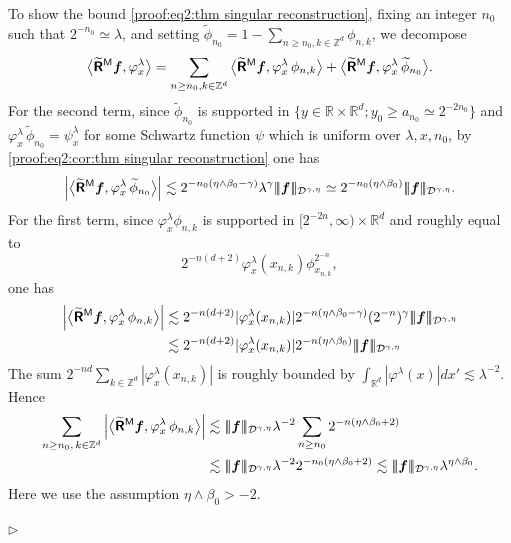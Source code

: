 \documentclass[10pt, reqno]{amsart}
\numberwithin{subsection}{section}
\numberwithin{subsubsection}{subsection}
\numberwithin{equation}{section} %
\newenvironment{Dem}[1][\unskip]{%
    \begin{list}{\hspace{1.15cm}{\sf \textbf{{\small Proof #1 --}}}}{%
        \setlength{\topsep}{0pt}%
        \setlength{\leftmargin}{0pt}%
        \setlength{\rightmargin}{0pt}%
        \setlength{\listparindent}{0pt}%
        \setlength{\itemindent}{0pt}%
        \setlength{\parsep}{0pt}%
        \addtolength{\leftmargin}{0pt}%
        \addtolength{\rightmargin}{0pt}%
    } \item }{\hfill $\rhd$\end{list}\smallskip}
\theoremstyle{mystyle}
\theoremstyle{mystyle2}
\theoremstyle{mystyle3}
\newcommand{\bsf}{\boldsymbol{f}}
\newcommand\bbR{\mathbb{R}}
\newcommand\bbZ{\mathbb{Z}}
\newcommand{\mcD}{\mathcal{D}}
\begin{document}
\begin{Dem}[of Theorem \ref{thm singular reconstruction}]
To show the bound \eqref{proof:eq2:thm singular reconstruction}, fixing an integer $n_0$ such that $2^{-n_0}\simeq \lambda$, and setting $\widetilde{\phi}_{n_0}=1-\sum_{n\ge n_0,k\in\bbZ^d}\phi_{n,k}$, we decompose
$$
\big\langle \widetilde{\textbf{\textsf{R}}}{}^{\sf M}\bsf,\varphi_x^\lambda \big\rangle
=\sum_{n\ge n_0,k\in\bbZ^d}\big\langle \widetilde{\textbf{\textsf{R}}}{}^{\sf M}\bsf,\varphi_x^\lambda\,\phi_{n,k} \big\rangle
+ \big\langle \widetilde{\textbf{\textsf{R}}}{}^{\sf M}\bsf,\varphi_x^\lambda\,\widetilde{\phi}_{n_0} \big\rangle.
$$
For the second term, since $\widetilde{\phi}_{n_0}$ is supported in $\{y\in\bbR\times\bbR^d;y_0\ge a_{n_0}\simeq2^{-2n_0}\}$ and $\varphi_x^\lambda\,\widetilde{\phi}_{n_0}=\psi_x^\lambda$ for some Schwartz function $\psi$ which is uniform over $\lambda,x,n_0$, by \eqref{proof:eq2:cor:thm singular reconstruction} one has
\begin{align*}
\left|\big\langle \widetilde{\textbf{\textsf{R}}}{}^{\sf M}\bsf,\varphi_x^\lambda\,\widetilde{\phi}_{n_0} \big\rangle\right|
\lesssim2^{-n_0(\eta\wedge\beta_0-\gamma)}\lambda^\gamma|\!|\!|\bsf|\!|\!|_{\mcD^{\gamma,\eta}}
\simeq2^{-n_0(\eta\wedge\beta_0)}|\!|\!|\bsf|\!|\!|_{\mcD^{\gamma,\eta}}.
\end{align*}
For the first term, since $\varphi_x^\lambda\phi_{n,k}$ is supported in $[2^{-2n},\infty)\times\bbR^d$ and roughly equal to 
$$
2^{-n(d+2)}\varphi_x^\lambda(x_{n,k})\phi_{x_{n,k}}^{2^{-n}},
$$ 
one has
\begin{align*}
\left|\big\langle \widetilde{\textbf{\textsf{R}}}{}^{\sf M}\bsf,\varphi_x^\lambda\,\phi_{n,k}\big\rangle\right|
&\lesssim2^{-n(d+2)}|\varphi_x^\lambda(x_{n,k})|2^{-n(\eta\wedge\beta_0-\gamma)}(2^{-n})^\gamma|\!|\!|\bsf|\!|\!|_{\mcD^{\gamma,\eta}}\\
&\lesssim2^{-n(d+2)}|\varphi_x^\lambda(x_{n,k})|2^{-n(\eta\wedge\beta_0)}|\!|\!|\bsf|\!|\!|_{\mcD^{\gamma,\eta}}
\end{align*}
The sum $2^{-nd}\sum_{k\in\bbZ^d}|\varphi_x^\lambda(x_{n,k})|$ is roughly bounded by $\int_{\bbR^d}|\varphi^\lambda(x)|dx'\lesssim\lambda^{-2}$. Hence
\begin{align*}
\sum_{n\ge n_0,\,k\in\bbZ^d}\left|\big\langle \widetilde{\textbf{\textsf{R}}}{}^{\sf M}\bsf,\varphi_x^\lambda\,\phi_{n,k}\big\rangle\right|
&\lesssim|\!|\!|\bsf|\!|\!|_{\mcD^{\gamma,\eta}}\lambda^{-2}\sum_{n\ge n_0}2^{-n(\eta\wedge\beta_0+2)}\\
&\lesssim|\!|\!|\bsf|\!|\!|_{\mcD^{\gamma,\eta}}\lambda^{-2}2^{-n_0(\eta\wedge\beta_0+2)}
\lesssim|\!|\!|\bsf|\!|\!|_{\mcD^{\gamma,\eta}}\lambda^{\eta\wedge\beta_0}.
\end{align*}
Here we use the assumption $\eta\wedge\beta_0>-2$.


\end{Dem}
\end{document}
